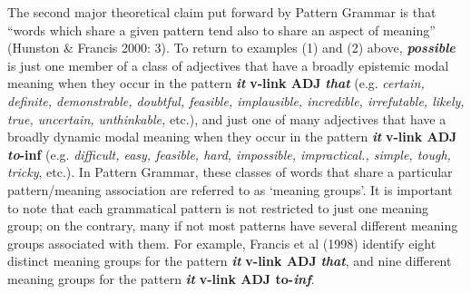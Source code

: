 \documentclass[12pt]{article}
\newenvironment{styleStandard}{\setlength\leftskip{0cm}\setlength\rightskip{0cm plus 1fil}\setlength\parindent{0cm}\setlength\parfillskip{0pt plus 1fil}\setlength\parskip{0in plus 1pt}\writerlistparindent\writerlistleftskip\leavevmode\normalfont\normalsize\writerlistlabel\ignorespaces}{\unskip\vspace{0.111in plus 0.0111in}\par}
\newcommand\writerlistleftskip{}
\newcommand\writerlistparindent{}
\newcommand\writerlistlabel{}
\begin{document}
\begin{styleStandard}
The second major theoretical claim put forward by Pattern Grammar is that “words which share a given pattern tend also to share an aspect of meaning” (Hunston \& Francis 2000: 3). To return to examples (1) and (2) above, \textbf{\textit{possible}} is just one member of a class of adjectives that have a broadly epistemic modal meaning when they occur in the pattern \textbf{\textit{it}}\textbf{ v-link ADJ }\textbf{\textit{that}} (e.g. \textit{certain, definite, demonstrable, doubtful, feasible, implausible, incredible, irrefutable, likely, true, uncertain, unthinkable,} etc.), and just one of many adjectives that have a broadly dynamic modal meaning when they occur in the pattern \textbf{\textit{it}}\textbf{ v-link ADJ }\textbf{\textit{to}}\textbf{{}-inf }(e.g. \textit{difficult, easy, feasible, hard, impossible, impractical., simple, tough, tricky}, etc.). In Pattern Grammar, these classes of words that share a particular pattern/meaning association are referred to as ‘meaning groups’. It is important to note that each grammatical pattern is not restricted to just one meaning group; on the contrary, many if not most patterns have several different meaning groups associated with them. For example, Francis et al (1998) identify eight distinct meaning groups for the pattern \textbf{\textit{it}}\textbf{ v-link ADJ }\textbf{\textit{that}}, and nine different meaning groups for the pattern \textbf{\textit{it}}\textbf{ v-link ADJ to-}\textbf{\textit{inf}}. 
\end{styleStandard}
\end{document}
